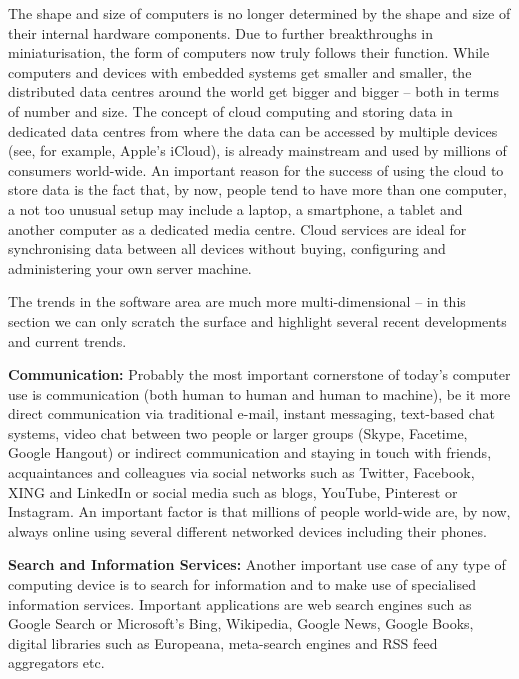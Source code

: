 \documentclass[10pt, plain]{../../metanetpaper}
\begin{document}
\begin{multicols}{2}
The shape and size of computers is no longer determined by the shape and size of their internal hardware components. Due to further breakthroughs in miniaturisation, the form of computers now truly follows their function. While computers and devices with embedded systems get smaller and smaller, the distributed data centres around the world get bigger and bigger -- both in terms of number and size. The concept of cloud computing and storing data in dedicated data centres from where the data can be accessed by multiple devices (see, for example, Apple's iCloud), is already mainstream and used by millions of consumers world-wide. An important reason for the success of using the cloud to store data is the fact that, by now, people tend to have more than one computer, a not too unusual setup may include a laptop, a smartphone, a tablet and another computer as a dedicated media centre. Cloud services are ideal for synchronising data between all devices without buying, configuring and administering your own server machine.

The trends in the software area are much more multi-dimensional -- in this section we can only scratch the surface and highlight several recent developments and current trends.

\textbf{Communication:} Probably the most important cornerstone of today's computer use is communication (both human to human and human to machine), be it more direct communication via traditional e-mail, instant messaging, text-based chat systems, video chat between two people or larger groups (Skype, Facetime, Google Hangout) or indirect communication and staying in touch with friends, acquaintances and colleagues via social networks such as Twitter, Facebook, XING and LinkedIn or social media such as blogs, YouTube, Pinterest or Instagram. An important factor is that millions of people world-wide are, by now, always online using several different networked devices including their phones. 

\textbf{Search and Information Services:} Another important use case of any type of computing device is to search for information and to make use of specialised information services. Important applications are web search engines such as Google Search or Microsoft's Bing, Wikipedia, Google News, Google Books, digital libraries such as Europeana, meta-search engines and RSS feed aggregators etc.

%
%


\end{multicols}
\end{document}
